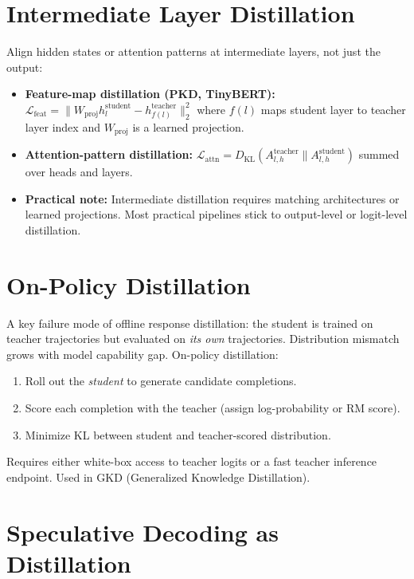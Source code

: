 \section{Intermediate Layer Distillation}

Align hidden states or attention patterns at intermediate layers, not just the output:

\begin{itemize}
  \item \textbf{Feature-map distillation (PKD, TinyBERT):} $\mathcal{L}_\text{feat} = \|W_\text{proj} h^\text{student}_l - h^\text{teacher}_{f(l)}\|_2^2$ where $f(l)$ maps student layer to teacher layer index and $W_\text{proj}$ is a learned projection.
  \item \textbf{Attention-pattern distillation:} $\mathcal{L}_\text{attn} = D_\text{KL}(A^\text{teacher}_{l,h} \| A^\text{student}_{l,h})$ summed over heads and layers.
  \item \textbf{Practical note:} Intermediate distillation requires matching architectures or learned projections. Most practical pipelines stick to output-level or logit-level distillation.
\end{itemize}

\section{On-Policy Distillation}

A key failure mode of offline response distillation: the student is trained on teacher trajectories but evaluated on \emph{its own} trajectories. Distribution mismatch grows with model capability gap. On-policy distillation:

\begin{enumerate}
  \item Roll out the \emph{student} to generate candidate completions.
  \item Score each completion with the teacher (assign log-probability or RM score).
  \item Minimize KL between student and teacher-scored distribution.
\end{enumerate}

Requires either white-box access to teacher logits or a fast teacher inference endpoint. Used in GKD \parencite{agarwal2024onpolicy} (Generalized Knowledge Distillation).

\section{Speculative Decoding as Distillation}


